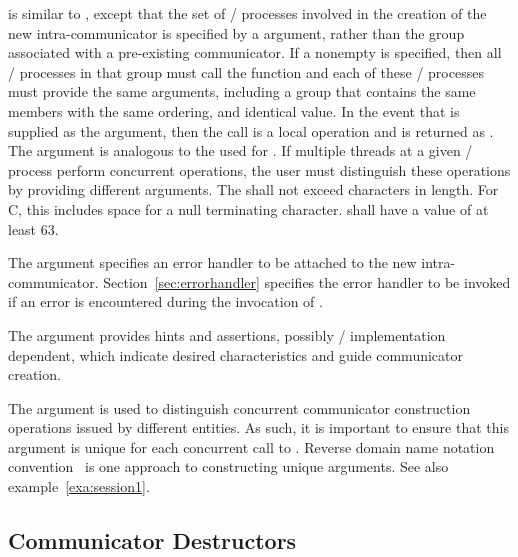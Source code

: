  is similar to
, except that the set of \MPI/ processes
involved in the creation of the new intra-communicator is specified by a
 argument, rather than the group associated with a pre-existing communicator.
If a nonempty  is specified, then
all \MPI/ processes in that group must call the function and
each of these \MPI/ processes must provide the same arguments,
including a group that contains the same members with the same ordering,
and identical  value.
In the event that  is supplied as the  argument, then
the call is a local operation and  is returned as .
The  argument is analogous to the  used for .
If multiple threads at a given \MPI/ process perform concurrent
 operations, the user must
distinguish these operations by providing different  arguments.
The  shall not exceed   characters in length.
For C, this includes space for a null terminating character.
 shall have a value of at least 63.

The  argument specifies an
error handler to be attached to the new intra-communicator.
Section~\ref{sec:errorhandler} specifies the error handler to be invoked if
an error is encountered during the invocation of .

The  argument provides hints and assertions,
possibly \MPI/ implementation dependent,
which indicate desired characteristics and guide communicator creation.

\begin{users}
The  argument is used to distinguish concurrent communicator construction operations
issued by different entities. As such, it is important to ensure that this argument is unique
for each concurrent call to .
Reverse domain name notation convention~\cite{reverseDNS} is one approach to constructing unique  arguments.
See also example~\ref{exa:session1}.
\end{users}

\subsection{Communicator Destructors}
\label{subsec:context-intracomdest}

